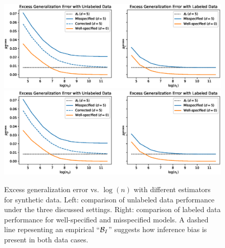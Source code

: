 \begin{figure}
    \centering
    \ifsinglecolumn
    \includegraphics[width=.75\textwidth]{eps_figures/biases.eps}
    \else
    \includegraphics[width=.48\textwidth]{eps_figures/biases.eps}
    \fi
    \caption{Excess generalization error vs. $\log(n)$ with different estimators for synthetic data. Left: comparison of unlabeled data performance under the three discussed settings. Right: comparison of labeled data performance for well-specified and misspecified models. A dashed line repesenting an empirical ``$\mathcal{B}_I$'' suggests how inference bias is present in both data cases. %
    }
    \label{fig:gen_err}
\end{figure}